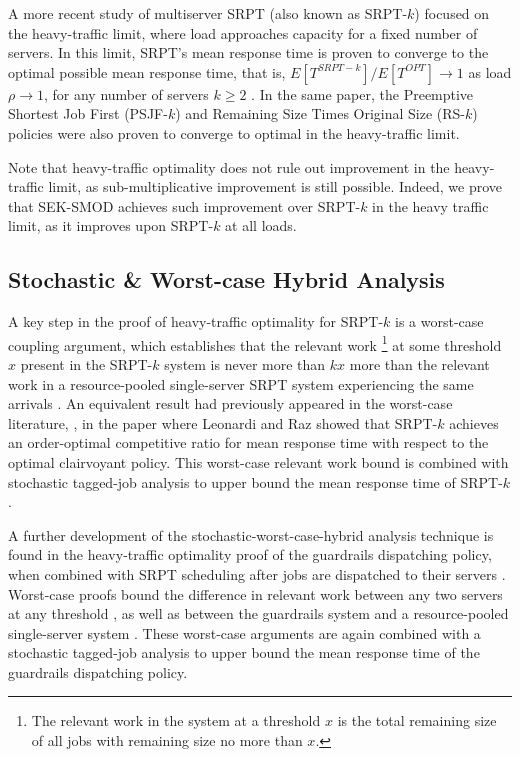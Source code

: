\documentclass[acmsmall]{acmart}
\begin{document}
A more recent study of multiserver SRPT (also known as SRPT-$k$) focused on the heavy-traffic limit, where load approaches capacity for a fixed number of servers. In this limit, SRPT's mean response time is proven to converge to the optimal possible mean response time, that is, $E[T^{SRPT-k}]/E[T^{OPT}] \to 1$ as load $\rho \to 1$, for any number of servers $k \ge 2$ \cite{grosof-etal-2019-srpt-k}.
In the same paper, the Preemptive Shortest Job First (PSJF-$k$)
and Remaining Size Times Original Size (RS-$k$) policies
were also proven to converge to optimal in the heavy-traffic limit.

Note that heavy-traffic optimality does not rule out improvement in the heavy-traffic limit, as sub-multiplicative improvement is still possible. Indeed, we prove that SEK-SMOD achieves such improvement over SRPT-$k$ in the heavy traffic limit, as it improves upon SRPT-$k$ at all loads.

\subsection{Stochastic \& Worst-case Hybrid Analysis}
\label{sec:prior-hybrid}

A key step in the proof of heavy-traffic optimality for SRPT-$k$
is a worst-case coupling argument,
which establishes that the relevant work%
\footnote{The relevant work in the system at a threshold $x$ is the total remaining size of all jobs with remaining size no more than $x$.}
at some threshold $x$
present in the SRPT-$k$ system is never more than $kx$ more
than the relevant work in a resource-pooled single-server SRPT system
experiencing the same arrivals \cite[Lemma~2]{grosof-etal-2019-srpt-k}.
An equivalent result had previously appeared in the worst-case literature, \cite[Lemma~2]{leonardi1997SRPT-worst-case1},
in the paper where Leonardi and Raz showed that SRPT-$k$ achieves an order-optimal competitive ratio for mean response time with respect to the optimal clairvoyant policy.
This worst-case relevant work bound is combined with stochastic tagged-job analysis to upper bound the mean response time of SRPT-$k$.

A further development of the stochastic-worst-case-hybrid analysis technique is found in the heavy-traffic optimality proof of the guardrails dispatching policy, when combined with SRPT scheduling after jobs are dispatched to their servers \cite{grosof-etal-2019guardrails}.
Worst-case proofs bound the difference in relevant work between
any two servers at any threshold \cite[Lemma 1]{grosof-etal-2019guardrails},
as well as between the guardrails system and a resource-pooled single-server system \cite[Lemma 2]{grosof-etal-2019guardrails}.
These worst-case arguments are again combined with a stochastic tagged-job analysis to upper bound the mean response time of the guardrails dispatching policy.
\end{document}
